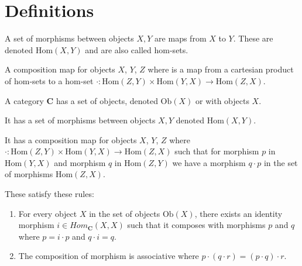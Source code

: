 \section{Definitions}

\begin{definition}
	\label{definition-set-of-morphisms}
	A set of morphisms between objects $X, Y$ are maps from $X$ to $Y$. 
	These are denoted $\mathrm{Hom}(X,Y)$ and are also called hom-sets.
\end{definition}

\begin{definition}
	\label{definition-composition-maps}
	A composition map for objects $X$, $Y$, $Z$ where is a map from a cartesian product of hom-sets to a hom-set $\cdot: \mathrm{Hom}(Z, Y) \times \mathrm{Hom}(Y,X) \rightarrow \mathrm{Hom}(Z, X)$.
\end{definition}

\begin{definition}[Category]
	\label{definition-category}
	A category $\mathbf{C}$ has a set of objects, denoted $\mathrm{Ob}(X)$ or with objects $X$.
	
	It has a set of morphisms between objects $X, Y$ denoted $\mathrm{Hom}(X,Y)$. 
	
	It has a composition map for objects $X$, $Y$, $Z$ where $\cdot: \mathrm{Hom}(Z, Y) \times \mathrm{Hom}(Y,X) \rightarrow \mathrm{Hom}(Z, X)$ such that for morphism $p$ in $\mathrm{Hom}(Y,X)$ and morphism $q$ in $\mathrm{Hom}(Z, Y)$ we have a morphism $q \cdot p$ in the set of morphisms $\mathrm{Hom}(Z, X)$.

	These satisfy these rules:

	\begin{enumerate}
		\item For every object $X$ in the set of objects $\mathrm{Ob}(X)$, there exists an identity morphism $i \in Hom_\mathbf{C}(X, X)$ such that it composes with morphisms $p$ and $q$ where $p = i \cdot p$ and $q \cdot i = q$.
		\item The composition of morphism is associative where $p \cdot ( q \cdot r) = (p \cdot q) \cdot r$.
	\end{enumerate}
\end{definition}

